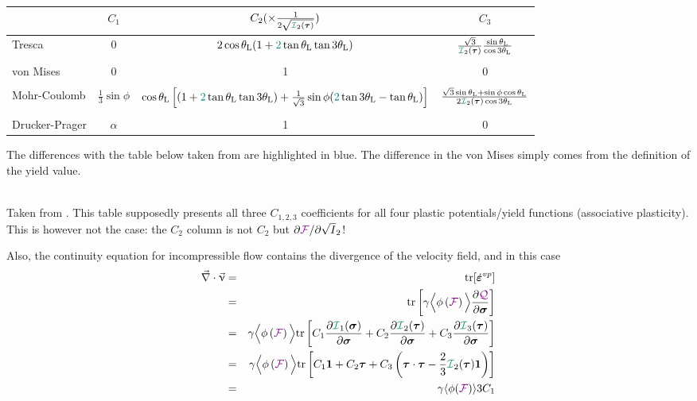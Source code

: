 \begin{center}
\begin{footnotesize}
\begin{tabular}{lccc}
\hline
& $C_1$ & $C_2(\times \frac{1}{2 \sqrt{{\III}_2({\bm \tau})}})$ & $C_3$ \\
              \hline\hline
Tresca         &0 & $2 \cos\theta_{\rm L} ( 1 + {\color{teal}2} \tan\theta_{\rm L}  \tan 3\theta_{\rm L})$ &
$\frac{\sqrt{3}}{{\III}_2({\bm \tau}) } \frac{\sin\theta_{\rm L} }{\cos 3\theta_{\rm L}}$
\\ \\
von Mises      &0& {\color{teal}1}& 0 \\ \\ 
Mohr-Coulomb   & $\frac13 \sin\phi$ & 
$
\cos \theta_{\rm L} \left[
(1 +  {\color{teal}2}\tan \theta_{\rm L}   \tan 3\theta_{\rm L})
+\frac{1}{\sqrt{3}} \sin\phi
( {\color{teal}2}\tan 3\theta_{\rm L} - \tan\theta_{\rm L}) \right]$
&
$\frac{\sqrt{3}\sin\theta_{\rm L} +  \sin \phi \cos \theta_{\rm L}}
{2 {\III}_2({\bm \tau}) \cos 3\theta_{\rm L}}$ 
\\ \\
Drucker-Prager & $\alpha$ & 1 & 0 \\  
\hline
\end{tabular}
\end{footnotesize}
\end{center}
The differences with the table below  taken from \textcite{owhi} are highlighted in blue.
The difference in the von Mises simply comes from the definition of the 
yield value.

\begin{center}
\\
{\captionfont Taken from \textcite{owhi}.
This table supposedly presents all three $C_{1,2,3}$ coefficients 
for all four plastic potentials/yield functions (associative plasticity).
This is however not the case: the $C_2$ column is not $C_2$ but 
$\partial {\color{violet}\cal F}/\partial\sqrt I_2$!
}
\end{center}


Also, the continuity equation for incompressible flow contains the divergence 
of the velocity field, and in this case 
\begin{eqnarray}
\vec\nabla\cdot\vec\upnu 
&=& {\rm tr}[\dot{\bm\varepsilon}^{vp}]  \nn\\
&=& {\rm tr}\left[ 
\gamma \Big\langle
\phi\left( {\FFF} \right) 
\Big\rangle
\frac{\partial \QQQ}{\partial \bm\sigma}
\right] \nn\\
&=& 
\gamma \Big\langle
\phi\left( {\FFF} \right) 
\Big\rangle
{\rm tr}\left[
C_1  \frac{\partial {\III}_1(\bm\sigma)}{\partial \bm\sigma} 
+
C_2  \frac{\partial {\III}_2(\bm\tau)}{\partial \bm\sigma} 
+
C_3  \frac{\partial {\III}_3(\bm\tau)}{\partial \bm\sigma} 
\right] \nn\\
&=&
\gamma \Big\langle
\phi\left( {\FFF} \right) 
\Big\rangle
{\rm tr}\left[
C_1 {\bm 1} 
+
C_2 {\bm \tau} 
+
C_3  \left( \bm\tau\cdot\bm\tau - \frac23  {\III}_2(\bm\tau)  {\bm 1} \right)
\right] \nn\\
&=&  \gamma \langle \phi(\FFF) \rangle  3 C_1
\end{eqnarray}

